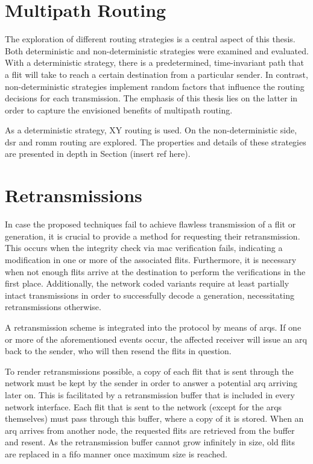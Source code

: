 
\section{Multipath Routing}
The exploration of different routing strategies is a central aspect of this thesis. Both deterministic and non-deterministic strategies were
examined and evaluated. With a deterministic strategy, there is a predetermined, time-invariant path that a flit will take to reach a certain destination
from a particular sender. In contrast, non-deterministic strategies implement random factors that influence the routing decisions for each
transmission. The emphasis of this thesis lies on the latter in order to capture the envisioned benefits of multipath routing.

As a deterministic strategy, XY routing is used. On the non-deterministic side, \gls{dsr} and \gls{romm} routing are explored. The properties and
details of these strategies are presented in depth in Section (insert ref here).

\section{Retransmissions}\label{sec:retransmissions}
In case the proposed techniques fail to achieve flawless transmission of a flit or generation, it is crucial to provide a method for requesting
their retransmission. This occurs when the integrity check via \gls{mac} verification fails, indicating a modification in one or more of the
associated flits. Furthermore, it is necessary when not enough flits arrive at the destination to perform the verifications in the first place.
Additionally, the network coded variants require at least partially intact transmissions in order to successfully decode a generation, necessitating
retransmissions otherwise.

A retransmission scheme is integrated into the protocol by means of \glspl{arq}. If one or more of the aforementioned events occur, the affected
receiver will issue an \gls{arq} back to the sender, who will then resend the flits in question.

To render retransmissions possible, a copy of each flit that is sent through the network must be kept by the sender in order to answer a potential
\gls{arq} arriving later on. This is facilitated by a retransmission buffer that is included in every network interface. Each flit that is sent to the
network (except for the \glspl{arq} themselves) must pass through this buffer, where a copy of it is stored. When an \gls{arq} arrives from another
node, the requested flits are retrieved from the buffer and resent. As the retransmission buffer cannot grow infinitely in size, old flits are
replaced in a \gls{fifo} manner once maximum size is reached.


